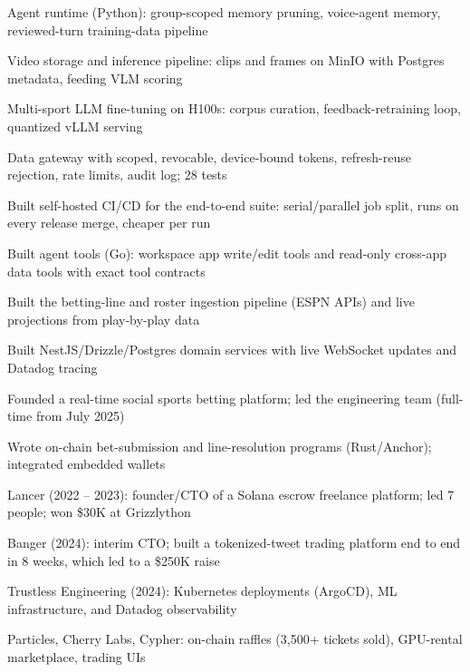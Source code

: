 \documentclass[print]{jack-resume}
\begin{document}
\begin{tightemize}
    \item Agent runtime (Python): group-scoped memory pruning, voice-agent memory, reviewed-turn training-data pipeline
    \item Video storage and inference pipeline: clips and frames on MinIO with Postgres metadata, feeding VLM scoring
    \item Multi-sport LLM fine-tuning on H100s: corpus curation, feedback-retraining loop, quantized vLLM serving
    \item Data gateway with scoped, revocable, device-bound tokens, refresh-reuse rejection, rate limits, audit log; 28 tests
    \item Built self-hosted CI/CD for the end-to-end suite: serial/parallel job split, runs on every release merge, cheaper per run
    \item Built agent tools (Go): workspace app write/edit tools and read-only cross-app data tools with exact tool contracts
\end{tightemize}
\sectionsep

\begin{tightemize}
    \item Built the betting-line and roster ingestion pipeline (ESPN APIs) and live projections from play-by-play data
    \item Built NestJS/Drizzle/Postgres domain services with live WebSocket updates and Datadog tracing
    \item Founded a real-time social sports betting platform; led the engineering team (full-time from July 2025)
    \item Wrote on-chain bet-submission and line-resolution programs (Rust/Anchor); integrated embedded wallets
\end{tightemize}
\sectionsep

\begin{tightemize}
    \item Lancer (2022 – 2023): founder/CTO of a Solana escrow freelance platform; led 7 people; won \$30K at Grizzlython
    \item Banger (2024): interim CTO; built a tokenized-tweet trading platform end to end in 8 weeks, which led to a \$250K raise
    \item Trustless Engineering (2024): Kubernetes deployments (ArgoCD), ML infrastructure, and Datadog observability
    \item Particles, Cherry Labs, Cypher: on-chain raffles (3,500+ tickets sold), GPU-rental marketplace, trading UIs
\end{tightemize}
\sectionsep
\end{document}
